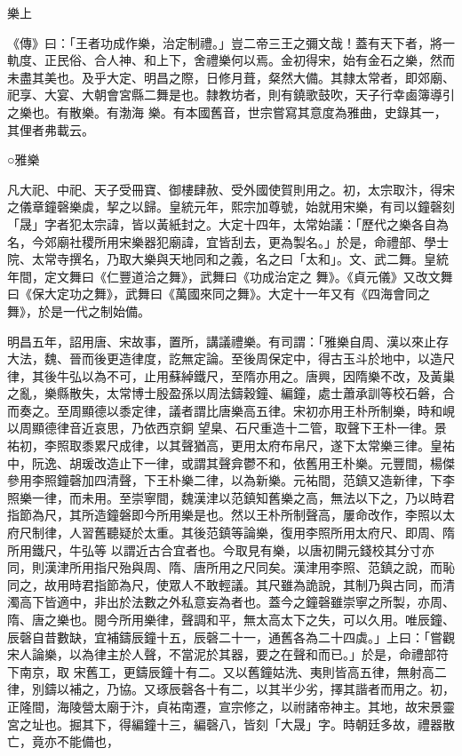 
\begin{pinyinscope}

 樂上



 《傳》曰：「王者功成作樂，治定制禮。」豈二帝三王之彌文哉！蓋有天下者，將一軌度、正民俗、合人神、和上下，舍禮樂何以焉。金初得宋，始有金石之樂，然而未盡其美也。及乎大定、明昌之際，日修月葺，粲然大備。其隸太常者，即郊廟、祀享、大宴、大朝會宮縣二舞是也。隸教坊者，則有鐃歌鼓吹，天子行幸鹵簿導引之樂也。有散樂。有渤海
 樂。有本國舊音，世宗嘗寫其意度為雅曲，史錄其一，其俚者弗載云。



 ○雅樂



 凡大祀、中祀、天子受冊寶、御樓肆赦、受外國使賀則用之。初，太宗取汴，得宋之儀章鐘磬樂虡，挈之以歸。皇統元年，熙宗加尊號，始就用宋樂，有司以鐘磬刻「晟」字者犯太宗諱，皆以黃紙封之。大定十四年，太常始議：「歷代之樂各自為名，今郊廟社稷所用宋樂器犯廟諱，宜皆刮去，更為製名。」於是，命禮部、學士院、太常寺撰名，乃取大樂與天地同和之義，名之曰「太和」。文、武二舞。皇統年間，定文舞曰《仁豐道洽之舞》，武舞曰《功成治定之
 舞》。《貞元儀》又改文舞曰《保大定功之舞》，武舞曰《萬國來同之舞》。大定十一年又有《四海會同之舞》，於是一代之制始備。



 明昌五年，詔用唐、宋故事，置所，講議禮樂。有司謂：「雅樂自周、漢以來止存大法，魏、晉而後更造律度，訖無定論。至後周保定中，得古玉斗於地中，以造尺律，其後牛弘以為不可，止用蘇綽鐵尺，至隋亦用之。唐興，因隋樂不改，及黃巢之亂，樂縣散失，太常博士殷盈孫以周法鑄穀鐘、編鐘，處士蕭承訓等校石磐，合而奏之。至周顯德以黍定律，議者謂比唐樂高五律。宋初亦用王朴所制樂，時和峴以周顯德律音近哀思，乃依西京銅
 望臬、石尺重造十二管，取聲下王朴一律。景祐初，李照取黍累尺成律，以其聲猶高，更用太府布帛尺，遂下太常樂三律。皇祐中，阮逸、胡瑗改造止下一律，或謂其聲弇鬱不和，依舊用王朴樂。元豐間，楊傑參用李照鐘磬加四清聲，下王朴樂二律，以為新樂。元祐間，范鎮又造新律，下李照樂一律，而未用。至崇寧間，魏漢津以范鎮知舊樂之高，無法以下之，乃以時君指節為尺，其所造鐘磐即今所用樂是也。然以王朴所制聲高，屢命改作，李照以太府尺制律，人習舊聽疑於太重。其後范鎮等論樂，復用李照所用太府尺、即周、隋所用鐵尺，牛弘等
 以謂近古合宜者也。今取見有樂，以唐初開元錢校其分寸亦同，則漢津所用指尺殆與周、隋、唐所用之尺同矣。漢津用李照、范鎮之說，而恥同之，故用時君指節為尺，使眾人不敢輕議。其尺雖為詭說，其制乃與古同，而清濁高下皆適中，非出於法數之外私意妄為者也。蓋今之鐘磬雖崇寧之所製，亦周、隋、唐之樂也。閱今所用樂律，聲調和平，無太高太下之失，可以久用。唯辰鐘、辰磬自昔數缺，宜補鑄辰鐘十五，辰磬二十一，通舊各為二十四虡。」上曰：「嘗觀宋人論樂，以為律主於人聲，不當泥於其器，要之在聲和而已。」於是，命禮部符下南京，取
 宋舊工，更鑄辰鐘十有二。又以舊鐘姑洗、夷則皆高五律，無射高二律，別鑄以補之，乃協。又琢辰磬各十有二，以其半少劣，擇其諧者而用之。初，正隆間，海陵營太廟于汴，貞祐南遷，宣宗修之，以祔諸帝神主。其地，故宋景靈宮之址也。掘其下，得編鐘十三，編磬八，皆刻「大晟」字。時朝廷多故，禮器散亡，竟亦不能備也，




\end{pinyinscope}
